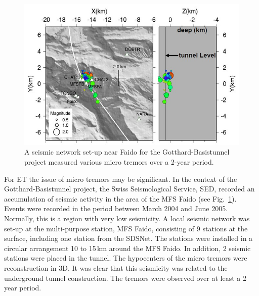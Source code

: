 \begin{figure}[htbp!]
\centering
\includegraphics[width=12cm]{./Sec_SiteInfra/Figures/faido.jpg}
\caption{A seismic network set-up near Faido for the Gotthard-Basistunnel project
measured various micro tremors over a 2-year period.}
\label{fig:faido}
\end{figure}
For ET the issue of micro tremors may be significant. In the context of the
Gotthard-Basistunnel project, the Swiss Seismological Service, SED, recorded an
accumulation of seismic activity in the area of the MFS Faido (see Fig.~\ref{fig:faido}). 
Events were recorded in the period between March 2004 and June 2005. Normally, this
is a region with very low seismicity. A local seismic network was set-up at the 
multi-purpose station, MFS Faido, consisting of 9 stations at the surface, including one station from the
SDSNet. The stations were installed in a circular arrangement 10 to 15\,km
around the MFS Faido. In addition, 2 seismic stations were placed in the tunnel.
The hypocenters of the micro tremors were reconstruction in 3D. It was
clear that this seismicity was related to the underground tunnel construction.
The tremors were observed over at least a 2 year period.


